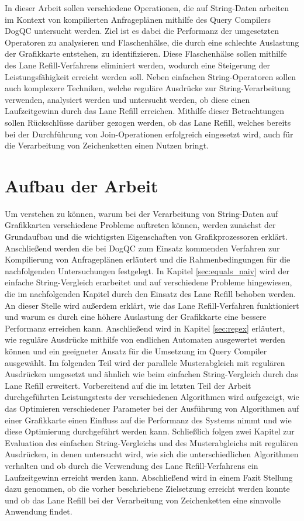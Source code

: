 In dieser Arbeit sollen verschiedene Operationen, die auf String-Daten arbeiten im Kontext von kompilierten Anfrageplänen mithilfe des Query Compilers DogQC untersucht werden.
Ziel ist es dabei die Performanz der umgesetzten Operatoren zu analysieren und Flaschenhälse, die durch eine schlechte Auslastung der Grafikkarte entstehen, zu identifizieren.
Diese Flaschenhälse sollen mithilfe des Lane Refill-Verfahrens eliminiert werden, wodurch eine Steigerung der Leistungsfähigkeit erreicht werden soll.
Neben einfachen String-Operatoren sollen auch komplexere Techniken, welche reguläre Ausdrücke zur String-Verarbeitung verwenden, analysiert werden und untersucht werden, ob diese einen Laufzeitgewinn durch das Lane Refill erreichen.
Mithilfe dieser Betrachtungen sollen Rückschlüsse darüber gezogen werden, ob das Lane Refill, welches bereits bei der Durchführung von Join-Operationen erfolgreich eingesetzt wird, auch für die Verarbeitung von Zeichenketten einen Nutzen bringt.

\section{Aufbau der Arbeit}

Um verstehen zu können, warum bei der Verarbeitung von String-Daten auf Grafikkarten verschiedene Probleme auftreten können, werden zunächst der Grundaufbau und die wichtigsten Eigenschaften von Grafikprozessoren erklärt.
Anschließend werden die bei DogQC zum Einsatz kommenden Verfahren zur Kompilierung von Anfrageplänen erläutert und die Rahmenbedingungen für die nachfolgenden Untersuchungen festgelegt.
In Kapitel \ref{sec:equals_naiv} wird der einfache String-Vergleich erarbeitet und auf verschiedene Probleme hingewiesen, die im nachfolgenden Kapitel durch den Einsatz des Lane Refill behoben werden.
An dieser Stelle wird außerdem erklärt, wie das Lane Refill-Verfahren funktioniert und warum es durch eine höhere Auslastung der Grafikkarte eine bessere Performanz erreichen kann.
Anschließend wird in Kapitel \ref{sec:regex} erläutert, wie reguläre Ausdrücke mithilfe von endlichen Automaten ausgewertet werden können und ein geeigneter Ansatz für die Umsetzung im Query Compiler ausgewählt.
Im folgenden Teil wird der parallele Musterabgleich mit regulären Ausdrücken umgesetzt und ähnlich wie beim einfachen String-Vergleich durch das Lane Refill erweitert.
Vorbereitend auf die im letzten Teil der Arbeit durchgeführten Leistungstests der verschiedenen Algorithmen wird aufgezeigt, wie das Optimieren verschiedener Parameter bei der Ausführung von Algorithmen auf einer Grafikkarte einen Einfluss auf die Performanz des Systems nimmt und wie diese Optimierung durchgeführt werden kann.
Schließlich folgen zwei Kapitel zur Evaluation des einfachen String-Vergleichs und des Musterabgleichs mit regulären Ausdrücken, in denen untersucht wird, wie sich die unterschiedlichen Algorithmen verhalten und ob durch die Verwendung des Lane Refill-Verfahrens ein Laufzeitgewinn erreicht werden kann.
Abschließend wird in einem Fazit Stellung dazu genommen, ob die vorher beschriebene Zielsetzung erreicht werden konnte und ob das Lane Refill bei der Verarbeitung von Zeichenketten eine sinnvolle Anwendung findet.